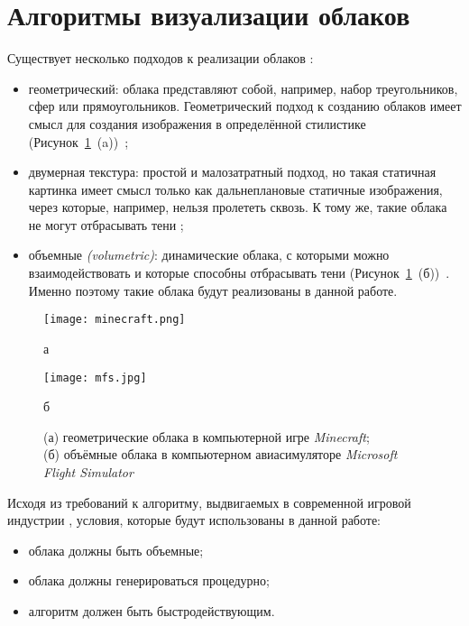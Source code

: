 \section{Алгоритмы визуализации облаков}
Существует несколько подходов к реализации облаков \cite{unigine_volumetric_clouds_2022,guerrilla_volumetric_cloudscapes_2023,  sym10040125}:	\begin{itemize}
\item геометрический: облака представляют собой, например, набор треугольников, сфер или прямоугольников. Геометрический подход к созданию облаков имеет смысл для создания изображения в определённой стилистике (Рисунок~\ref{fig:clouds}~(a))~\cite{unigine_volumetric_clouds_2022};
\item двумерная текстура: простой и малозатратный подход, но такая статичная картинка имеет смысл только как дальнеплановые статичные изображения, через которые, например, нельзя пролететь сквозь. К тому же, такие облака не могут отбрасывать тени \cite{unigine_volumetric_clouds_2022};
\item объемные \textit{(volumetric)}: динамические облака, с которыми можно взаимодействовать и которые способны отбрасывать тени (Рисунок~\ref{fig:clouds}~(б))~\cite{shadows2023, guerrilla_volumetric_cloudscapes_2023}. Именно поэтому такие облака будут реализованы в данной работе.
\end{itemize}
\begin{figure}[h!]
	\centering
	\begin{minipage}{0.48\textwidth}
		\label{fig:minecraft}
		\centering
		\texttt{[image: minecraft.png]}
		\caption*{а}
	\end{minipage}
	\hfill
	\begin{minipage}{0.48\textwidth}
		\label{fig:unigine_volumetric_clouds_2022}
		\centering
		\texttt{[image: mfs.jpg]}
		\caption*{б}
	\end{minipage}
	\caption{(а) геометрические облака в компьютерной игре \textit{Minecraft};\\ (б) объёмные облака в компьютерном авиасимуляторе \textit{Microsoft Flight Simulator}}
	\label{fig:clouds}
\end{figure}


Исходя из требований к алгоритму, выдвигаемых в современной игровой индустрии \cite{unigine_volumetric_clouds_2022,guerrilla_volumetric_cloudscapes_2023,  sym10040125}, условия, которые будут использованы в данной работе:
\begin{itemize}
	\item облака должны быть объемные;
	\item облака должны генерироваться процедурно;
	\item алгоритм должен быть быстродействующим.
\end{itemize}
